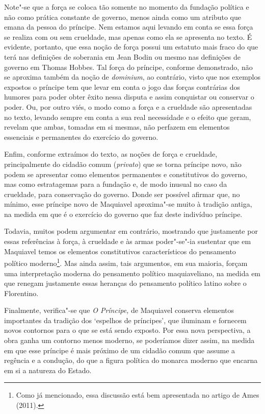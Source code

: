 Note"-se que a força se coloca tão somente no momento da fundação
política e não como prática constante de governo, menos ainda como um
atributo que emana da pessoa do príncipe. Nem estamos aqui levando em
conta se essa força se realiza com ou sem crueldade, mas apenas como ela
se apresenta no texto. É evidente, portanto, que essa noção de força
possui um estatuto mais fraco do que terá nas definições de soberania em
Jean Bodin ou mesmo nas definições de governo em Thomas Hobbes. Tal
força do príncipe, conforme demonstrado, não se aproxima também da noção
de \emph{dominium}, ao contrário, visto que nos exemplos expostos o
príncipe tem que levar em conta o jogo das forças contrárias dos humores
para poder obter êxito nessa disputa e assim conquistar ou conservar o
poder. Ou, por outro viés, o modo como a força e a crueldade são
apresentadas no texto, levando sempre em conta a sua real necessidade e
o efeito que geram, revelam que ambas, tomadas em si mesmas, não
perfazem em elementos essenciais e permanentes do exercício do governo.

Enfim, conforme extraímos do texto, as noções de força e crueldade,
principalmente do cidadão comum (\emph{privato}) que se torna príncipe
novo, não podem se apresentar como elementos permanentes e constitutivos
do governo, mas como estratagemas para a fundação e, de modo inusual no
caso da crueldade, para conservação do governo. Donde ser possível
afirmar que, no mínimo, esse príncipe novo de Maquiavel aproxima"-se
muito à tradição antiga, na medida em que é o exercício do governo que
faz deste indivíduo príncipe.

Todavia, muitos podem argumentar em contrário, mostrando que justamente
por essas referências à força, à crueldade e às armas poder"-se"-ia
sustentar que em Maquiavel temos os elementos constitutivos
característicos do pensamento político moderno\footnote{Como já
  mencionado, essa discussão está bem apresentada no artigo de Ames
  (2011).}. Mas ainda assim, tais argumentos, em sua maioria, forçam uma
interpretação moderna do pensamento político maquiaveliano, na medida em
que renegam justamente essas heranças do pensamento político latino
sobre o Florentino.

Finalmente, verifica"-se que \emph{O Príncipe,} de Maquiavel conserva
elementos importantes da tradição dos `espelhos de príncipes', que
iluminam e fornecem novos contornos para o que se está sendo exposto.
Por essa nova perspectiva, a obra ganha um contorno menos moderno, se
poderíamos dizer assim, na medida em que esse príncipe é mais próximo de
um cidadão comum que assume a regência e a condução, do que a figura
política do monarca moderno que encarna em si a natureza do Estado.

